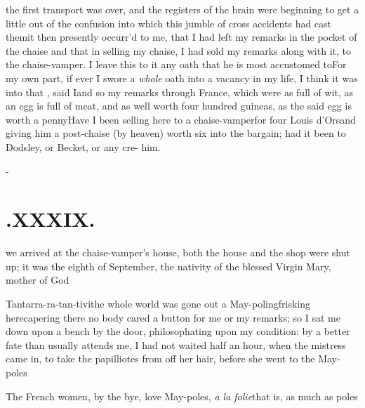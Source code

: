 \documentclass{article}
\begin{document}
 the first transport was over,
and the registers of the brain were beginning to get a little out
of the confusion into which this jumble of cross accidents had cast
them\tsk it then presently occurr’d to me, that I had left
my remarks in the pocket of the chaise\break
\tsk and that in selling my
chaise, I had sold my remarks along with it, to the chaise-vamper.
\hskip 78pt  I leave this \break to it any oath that he is most accustomed
to\tsh For my own part, if ever I swore a \textit{whole}
oath into a vacancy in my life, I think it was into
that\tsh {}  , said I\tsk and so my
remarks through France, which were as full of wit, as an egg
is full of meat, and as well worth four hundred guineas, as the
said egg is worth a penny\tsk Have I been selling here to a
chaise-vamper\tsk for four Louis d’Ors\tsk and
giving him a post-chaise (by heaven) worth six into the bargain;
had it been to Dodsley, or Becket, or any
cre- 
him.

\vfill{}\eject
\null\kern-\baselineskip
\section{.\enspace XXXIX.}

 we arrived at the
chaise-vamper’s house, both the house and the shop were shut
up; it was the eighth of September, the nativity of the
blessed Virgin Mary, mother of God\tsh

\tsh Tantarra-ra-tan-tivi\tsh the whole world was gone out a
May-poling\break\tsk frisking here\tsk capering there\tsk
no\break
body cared a button for me or my remarks; so I sat me down upon
a bench by the door, philosophating upon my condition: by a
better fate than usually attends me, I had not waited half an
hour, when the mistress came in, to take the papilliotes from
off her hair, before she went to the May-poles\tsh

The French women, by the bye, love May-poles, \textit{a
la folie}\tsk that is, as much as
poles\tsh
\end{document}
